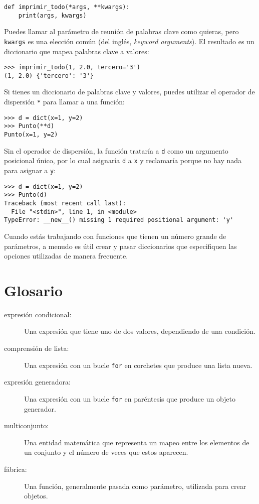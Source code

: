 \documentclass[10pt]{book}
\begin{document}
\begin{verbatim}
def imprimir_todo(*args, **kwargs):
    print(args, kwargs)
\end{verbatim}
%
Puedes llamar al parámetro de reunión de palabras clave como quieras, pero
{\tt kwargs} es una elección común (del inglés, {\em keyword arguments}).  El resultado es un diccionario que mapea
palabras clave a valores:

\begin{verbatim}
>>> imprimir_todo(1, 2.0, tercero='3')
(1, 2.0) {'tercero': '3'}
\end{verbatim}
%
Si tienes un diccionario de palabras clave y valores, puedes utilizar el
operador de dispersión {\tt **} para llamar a una función:

\begin{verbatim}
>>> d = dict(x=1, y=2)
>>> Punto(**d)
Punto(x=1, y=2)
\end{verbatim}
%
Sin el operador de dispersión, la función trataría a {\tt d} como
un argumento posicional único, por lo cual asignaría {\tt d} a
{\tt x} y reclamaría porque no hay nada para asignar a {\tt y}:

\begin{verbatim}
>>> d = dict(x=1, y=2)
>>> Punto(d)
Traceback (most recent call last):
  File "<stdin>", line 1, in <module>
TypeError: __new__() missing 1 required positional argument: 'y'
\end{verbatim}
%
Cuando estás trabajando con funciones que tienen un número grande de
parámetros, a menudo es útil crear y pasar diccionarios
que especifiquen las opciones utilizadas de manera frecuente.


\section{Glosario}

\begin{description}

\item[expresión condicional:] Una expresión que tiene uno de dos
valores, dependiendo de una condición.

\item[comprensión de lista:] Una expresión con un bucle {\tt for} en
corchetes que produce una lista nueva.

\item[expresión generadora:] Una expresión con un bucle {\tt for} en paréntesis
que produce un objeto generador.

\item[multiconjunto:] Una entidad matemática que representa un mapeo
entre los elementos de un conjunto y el número de veces que estos aparecen.

\item[fábrica:] Una función, generalmente pasada como parámetro, utilizada para
crear objetos.

\end{description}
\end{document}
